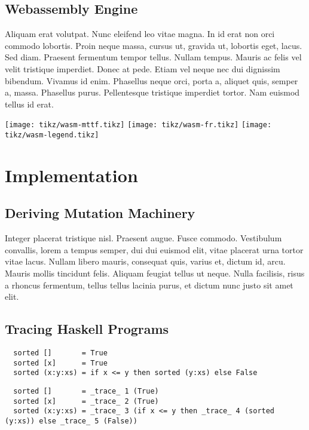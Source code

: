 \documentclass[acmsmall, anonymous]{acmart}
\begin{document}
\subsection{Webassembly Engine}

Aliquam erat volutpat. Nunc eleifend leo vitae magna. In id erat non orci
commodo lobortis. Proin neque massa, cursus ut, gravida ut, lobortis eget,
lacus. Sed diam. Praesent fermentum tempor tellus. Nullam tempus. Mauris ac
felis vel velit tristique imperdiet. Donec at pede. Etiam vel neque nec dui
dignissim bibendum. Vivamus id enim. Phasellus neque orci, porta a, aliquet
quis, semper a, massa. Phasellus purus. Pellentesque tristique imperdiet tortor.
Nam euismod tellus id erat.

\begin{center}
  \texttt{[image: tikz/wasm-mttf.tikz]}
  \texttt{[image: tikz/wasm-fr.tikz]}\vspace{-5pt}
  \texttt{[image: tikz/wasm-legend.tikz]}
\end{center}

\section{Implementation}
\label{sec:implementation}

\subsection{Deriving Mutation Machinery}

Integer placerat tristique nisl. Praesent augue. Fusce commodo. Vestibulum
convallis, lorem a tempus semper, dui dui euismod elit, vitae placerat urna
tortor vitae lacus. Nullam libero mauris, consequat quis, varius et, dictum id,
arcu. Mauris mollis tincidunt felis. Aliquam feugiat tellus ut neque. Nulla
facilisis, risus a rhoncus fermentum, tellus tellus lacinia purus, et dictum
nunc justo sit amet elit.

\subsection{Tracing Haskell Programs}

\begin{verbatim}
  sorted []       = True
  sorted [x]      = True
  sorted (x:y:xs) = if x <= y then sorted (y:xs) else False
\end{verbatim}

\begin{verbatim}
  sorted []       = _trace_ 1 (True)
  sorted [x]      = _trace_ 2 (True)
  sorted (x:y:xs) = _trace_ 3 (if x <= y then _trace_ 4 (sorted (y:xs)) else _trace_ 5 (False))
\end{verbatim}
\end{document}
